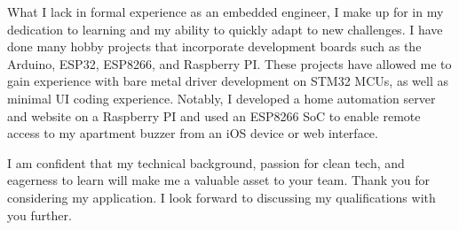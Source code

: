 \documentclass[12pt, letterpaper]{awesome-cv} %
\begin{document}
\begin{cvletter}

    What I lack in formal experience as an embedded engineer, I make up for in my dedication to learning and my ability to quickly adapt to new challenges. I have done many hobby projects that incorporate development boards such as the Arduino, ESP32, ESP8266, and Raspberry PI. These projects have allowed me to gain experience with bare metal driver development on STM32 MCUs, as well as minimal UI coding experience. Notably, I developed a home automation server and website on a Raspberry PI and used an ESP8266 SoC to enable remote access to my apartment buzzer from an iOS device or web interface.

    I am confident that my technical background, passion for clean tech, and eagerness to learn will make me a valuable asset to your team. Thank you for considering my application. I look forward to discussing my qualifications with you further.


\end{cvletter}


\makeletterclosing %
\end{document}

